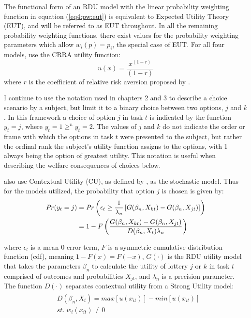 \documentclass[../main.tex]{subfiles}
\begin{document}
The functional form of an RDU model with the linear probability weighting function in equation (\ref{eq4:pw:eut}) is equivalent to Expected Utility Theory (EUT), and will be referred to as EUT throughout.
In all the remaining probability weighting functions, there exist values for the probability weighting parameters which allow $w_i(p) = p_i$, the special case of EUT.
For all four models, \textcite{Harrison2016} use the CRRA utility function:
\begin{equation}
	\label{eq4:CRRA}
	u(x) = \frac{x^{(1-r)}}{(1-r)}
\end{equation}
\noindent where $r$ is the coefficient of relative risk aversion proposed by \textcite{Pratt1964}.

I continue to use the notation used in chapters 2 and 3 to describe a choice scenario by a subject, but limit it to a binary choice between two options, $j$ and $k$.
In this framework a choice of option $j$ in task $t$ is indicated by the function $y_t = j$, where $y_t = 1 \geq^n y_t = 2$.
The values of $j$ and $k$ do not indicate the order or frame with which the options in task $t$ were presented to the subject, but rather the ordinal rank the subject's utility function assigns to the options, with 1 always being the option of greatest utility.
This notation is useful when describing the welfare consequences of choices below.

\textcite{Harrison2016} also use Contextual Utility (CU), as defined by \textcite{Wilcox2008}, as the stochastic model.
Thus for the models utilized, the probability that option $j$ is chosen is given by:
\begin{align}
	\label{eq4:RE.2}
	\begin{split}
		{\ensuremath{\mathit{Pr}}}(y_t = j) &= {\mathit{Pr}}\left(  \epsilon_t \geq \frac{1}{\lambda_n} \left[ G(\beta_n,X_{kt}) - G(\beta_n,X_{jt}) \right] \right)\\
		&= 1 - F\left( \dfrac{G(\beta_n,X_{kt}) - G(\beta_n,X_{jt})}{D(\beta_n,X_t)\lambda_n }  \right)
	\end{split}
\end{align}

\noindent where $\epsilon_t$ is a mean 0 error term, $F$ is a symmetric cumulative distribution function (cdf), meaning $1 - F(x)  = F(-x)$, $G(\cdot)$ is the RDU utility model that takes the parameters $\beta_n$ to calculate the utility of lottery $j$ or $k$ in task $t$ comprised of outcomes and probabilities $X_{jt}$, and $\lambda_n$ is a precision parameter.
The function $D(\cdot)$ separates contextual utility from a Strong Utility model:
\begin{align}
	\label{eq4:W.cu}
	\begin{split}
		&D(\beta_n,X_t) = \mathit{max}[u(x_{it})] - \mathit{min}[u(x_{it})]\\
		&\mathit{st.}\; w_i(x_{it}) \neq 0
	\end{split}
\end{align}
\end{document}
